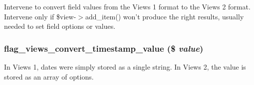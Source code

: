 Intervene to convert field values from the Views 1 format to the Views 2 format. Intervene only if \$view-$>$add\_\-item() won't produce the right results, usually needed to set field options or values. \hypertarget{flag_8views__convert_8inc_cab0389970f9bad22da831d1ef2ee0db}{
\subsubsection[{flag\_\-views\_\-convert\_\-timestamp\_\-value}]{\setlength{\rightskip}{0pt plus 5cm}flag\_\-views\_\-convert\_\-timestamp\_\-value (\$ {\em value})}}
\label{flag_8views__convert_8inc_cab0389970f9bad22da831d1ef2ee0db}


In Views 1, dates were simply stored as a single string. In Views 2, the value is stored as an array of options. 